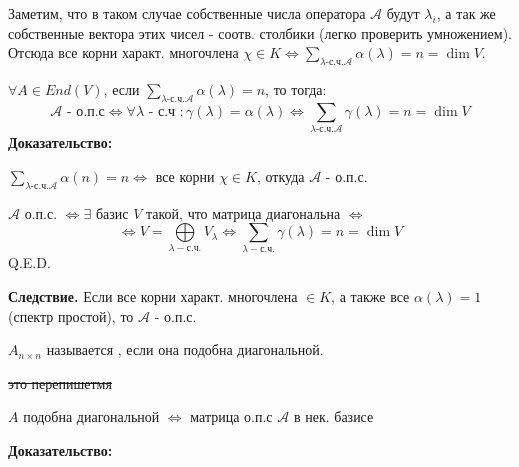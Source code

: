 Заметим, что в таком случае  собственные числа  оператора $\mathcal{A}$ будут $\lambda_i$, а так же собственные вектора этих чисел - соотв. столбики (легко проверить умножением). Отсюда  все корни характ. многочлена  $\chi \in K \Leftrightarrow \sum\limits_{\lambda \text{-с.ч.} \mathcal{A}}\alpha(\lambda) = n = \dim V$.




$\forall A \in End(V)$, если  $\sum\limits_{\lambda \text{-с.ч.} \mathcal{A}} \alpha(\lambda)= n$, то тогда:
$$\mathcal{A} \text{ - о.п.с} \Leftrightarrow \forall\lambda \text{ - с.ч }: \gamma(\lambda) = \alpha(\lambda) \Leftrightarrow \sum\limits_{\lambda \text{-с.ч.} \mathcal{A}}\gamma(\lambda) = n = \dim V$$
\textbf{Доказательство:}

$ \sum\limits_{\lambda \text{-с.ч.} \mathcal{A}} \alpha(n) = n \Leftrightarrow$ все корни $\chi \in K$, откуда $\mathcal{A}$ -  о.п.с.

$\mathcal{A}$ о.п.с. $\Leftrightarrow \exists$ базис $V$ такой, что матрица диагональна $\Leftrightarrow$ $$\Leftrightarrow V = \bigoplus\limits_{\lambda - \text{с.ч.}}V_{\lambda} \Leftrightarrow \sum\limits_{\lambda - \text{с.ч.}}\gamma(\lambda) = n =\dim V$$
\hfill Q.E.D.

\textbf{Следствие.} Если все корни характ. многочлена $\in K$, а также все $\alpha(\lambda)=1$ (спектр простой), то $\mathcal{A}$ - о.п.с.

 $A_{n\times n}$ называется , если  она подобна диагональной.


\sout{это перепишетмя}

$A$ подобна диагональной $\Leftrightarrow$ матрица о.п.с $\mathcal{A}$ в нек. базисе

\textbf{Доказательство:}

